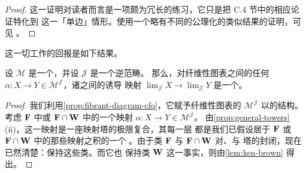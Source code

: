 \begin{proof}
这一证明对读者而言是一项颇为冗长的练习，它只是把 C.4 节中的相应论证特化到
这一「单边」情形。使用一个略有不同的公理化的类似结果的证明，可见
\cite[9.2.4]{bib94}。
\end{proof}

这一切工作的回报是如下结果。

\begin{proposition}\label{prop:inverse-limits-we}
设 $\mathcal{M}$ 是一个\trCategoryOfFibrantObjects，并设 $\mathcal{J}$ 是一个逆范畴。
那么，对纤维性图表之间的任何\trPointwise{}\trWeakEquivalence{}
$\alpha\colon X\to Y\in\mathcal{M}^{\mathcal{J}}$，诸\trLimit{}之间的诱导
映射 $\operatorname{lim}_{\mathcal{J}}X\to\operatorname{lim}_{\mathcal{J}}Y$
是一个\trWeakEquivalence。
\end{proposition}

\begin{proof}
我们利用\cref{prop:fibrant-diagram-cfo}，它赋予纤维性图表的\trCategory{}
$\mathcal{M}^{\mathcal{J}}$ 以\trCategoryOfFibrantObjects{}的结构。考虑 $\mathbf{F}$ 中或
$\mathbf{F}\cap\mathbf{W}$ 中的一个映射 $\alpha\colon X\to Y\in\mathcal{M}^{\mathcal{J}}$。
由\cref{prop:general-towers}(ii)，这一映射是一座映射塔的极限复合，其每一层
都是我们已假设居于 $\mathbf{F}$ 或 $\mathbf{F}\cap\mathbf{W}$ 中的那些映射之积的一个%
\trPullback。由于类 $\mathbf{F}$ 与 $\mathbf{F}\cap\mathbf{W}$ 对\trProduct、\trPullback{}与
塔的\trLimit{}封闭，现在已然清楚：\trLimit{}\trFunctor{}保持这些类。而它也
保持类 $\mathbf{W}$ 这一事实，则由\cref{lem:ken-brown} 得出。
\end{proof}


